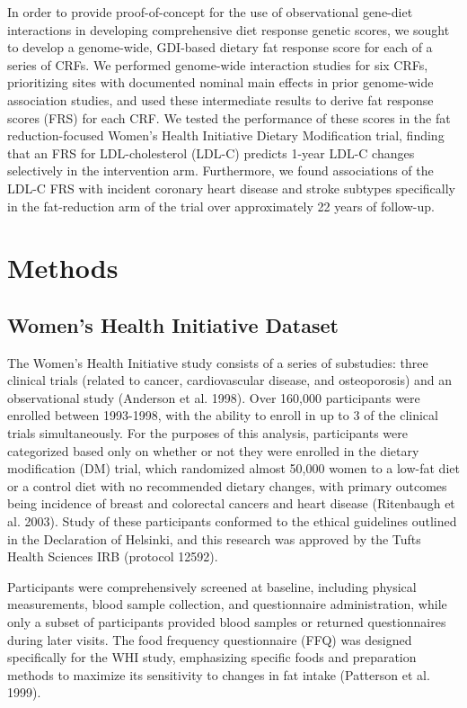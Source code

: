 \documentclass[]{article}
\begin{document}
In order to provide proof-of-concept for the use of observational
gene-diet interactions in developing comprehensive diet response genetic
scores, we sought to develop a genome-wide, GDI-based dietary fat
response score for each of a series of CRFs. We performed genome-wide
interaction studies for six CRFs, prioritizing sites with documented
nominal main effects in prior genome-wide association studies, and used
these intermediate results to derive fat response scores (FRS) for each
CRF. We tested the performance of these scores in the fat
reduction-focused Women's Health Initiative Dietary Modification trial,
finding that an FRS for LDL-cholesterol (LDL-C) predicts 1-year LDL-C
changes selectively in the intervention arm. Furthermore, we found
associations of the LDL-C FRS with incident coronary heart disease and
stroke subtypes specifically in the fat-reduction arm of the trial over
approximately 22 years of follow-up.

\hypertarget{methods}{%
\section{Methods}\label{methods}}

\hypertarget{womens-health-initiative-dataset}{%
\subsection{Women's Health Initiative
Dataset}\label{womens-health-initiative-dataset}}

The Women's Health Initiative study consists of a series of substudies:
three clinical trials (related to cancer, cardiovascular disease, and
osteoporosis) and an observational study (Anderson et al. 1998). Over
160,000 participants were enrolled between 1993-1998, with the ability
to enroll in up to 3 of the clinical trials simultaneously. For the
purposes of this analysis, participants were categorized based only on
whether or not they were enrolled in the dietary modification (DM)
trial, which randomized almost 50,000 women to a low-fat diet or a
control diet with no recommended dietary changes, with primary outcomes
being incidence of breast and colorectal cancers and heart disease
(Ritenbaugh et al. 2003). Study of these participants conformed to the
ethical guidelines outlined in the Declaration of Helsinki, and this
research was approved by the Tufts Health Sciences IRB (protocol 12592).

Participants were comprehensively screened at baseline, including
physical measurements, blood sample collection, and questionnaire
administration, while only a subset of participants provided blood
samples or returned questionnaires during later visits. The food
frequency questionnaire (FFQ) was designed specifically for the WHI
study, emphasizing specific foods and preparation methods to maximize
its sensitivity to changes in fat intake (Patterson et al. 1999).
\end{document}
